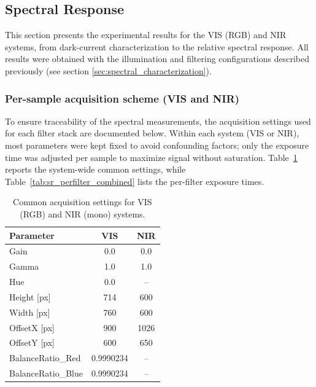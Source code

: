 \subsection{Spectral Response}
\label{sec:spectral_response}

This section presents the experimental results for the VIS (RGB) and NIR systems, from dark-current characterization to the relative spectral response. All results were obtained with the illumination and filtering configurations described previously (see section \ref{sec:spectral_characterization}).

\subsubsection*{Per-sample acquisition scheme (VIS and NIR)}

\noindent
To ensure traceability of the spectral measurements, the acquisition settings used for each filter stack are documented below. Within each system (VIS or NIR), most parameters were kept fixed to avoid confounding factors; only the exposure time was adjusted per sample to maximize signal without saturation. Table~\ref{tab:sr_common_settings} reports the system-wide common settings, while Table~\ref{tab:sr_perfilter_combined} lists the per-filter exposure times.\\

\begin{table}[H]
    \centering
    \caption{Common acquisition settings for VIS (RGB) and NIR (mono) systems.}
    \label{tab:sr_common_settings}
    \begin{tabular}{|l|c|c|}
        \hline
        \rowcolor[HTML]{EFEFEF}\textbf{Parameter} & \textbf{VIS} & \textbf{NIR} \\ \hline
        Gain               & 0.0       & 0.0 \\ \hline
        Gamma              & 1.0       & 1.0 \\ \hline
        Hue                & 0.0       & --  \\ \hline
        Height [px]        & 714       & 600 \\ \hline
        Width  [px]        & 760       & 600 \\ \hline
        OffsetX [px]       & 900       & 1026 \\ \hline
        OffsetY [px]       & 600       & 650 \\ \hline
        BalanceRatio\_Red  & 0.9990234 & -- \\ \hline
        BalanceRatio\_Blue & 0.9990234 & -- \\ \hline
    \end{tabular}
\end{table}

